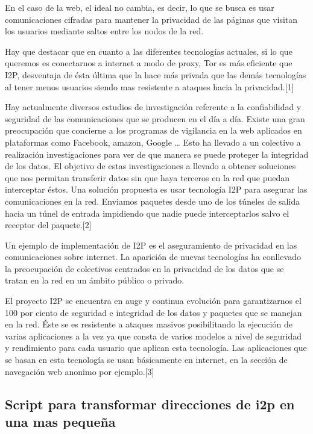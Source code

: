 \documentclass[12]{article}
\begin{document}
En el caso de la web, el ideal no cambia, es decir, lo que se busca es usar comunicaciones cifradas para mantener la privacidad de las páginas que visitan los usuarios mediante saltos entre los nodos de la red.

Hay que destacar que en cuanto a las diferentes tecnologías actuales, si lo que queremos es conectarnos a internet a modo de proxy,  Tor es más eficiente que I2P, desventaja de ésta última que la hace más privada que las demás tecnologías al tener menos usuarios siendo mas resistente a ataques hacia la privacidad.[1]

Hay actualmente diversos estudios de investigación referente a la confiabilidad y seguridad de las comunicaciones que se producen en el día a día.
Existe una gran preocupación que concierne a los programas de vigilancia en la web aplicados en plataformas como Facebook, amazon, Google … Esto ha llevado a un colectivo a realización investigaciones para ver de que manera se puede proteger la integridad de los datos. El objetivo de estas investigaciones a llevado a obtener soluciones que nos permitan transferir datos sin que haya terceros
en la red que puedan interceptar éstos.
Una solución propuesta es usar tecnología I2P para asegurar las comunicaciones en la red. Enviamos paquetes desde uno de los túneles de salida hacia un túnel de entrada  impidiendo que nadie puede interceptarlos salvo el receptor del paquete.[2]

Un ejemplo de implementación de I2P es el aseguramiento de privacidad en las comunicaciones sobre internet.
La aparición de nuevas tecnologías ha conllevado la preocupación de colectivos centrados en la privacidad de los datos que se tratan en la red en un ámbito público o privado.

El proyecto I2P se encuentra en auge y continua evolución para garantizarnos el 100 por ciento de seguridad e integridad de los datos y paquetes que se manejan en la red. Éste se  es resistente a ataques masivos posibilitando la ejecución de varias aplicaciones a 
la vez ya que consta de varios modelos a nivel de seguridad y rendimiento para cada usuario que aplican esta tecnología. Las aplicaciones que se basan en esta tecnología se usan básicamente en internet, en la sección de navegación web anonimo por ejemplo.[3]

\subsection{Script para transformar direcciones de i2p en una mas pequeña}
\end{document}
